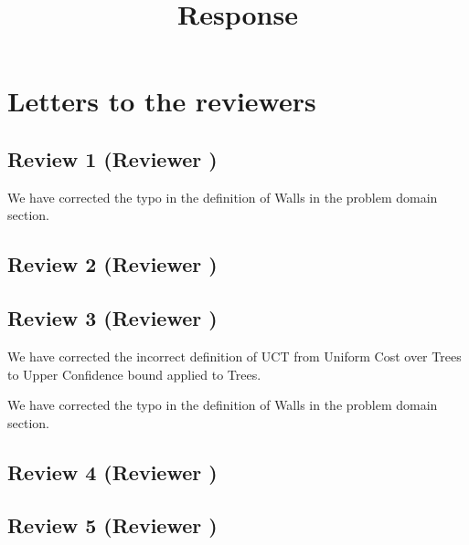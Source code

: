 \documentclass{article}
\title{Response}
\begin{document}
\maketitle
\section{Letters to the reviewers}
\subsection{Review 1 (Reviewer )}
We have corrected the typo in the definition of Walls in the problem domain section.
\subsection{Review 2 (Reviewer )}
\subsection{Review 3 (Reviewer )}
We have corrected the incorrect definition of UCT from Uniform Cost over Trees to Upper Confidence bound applied to Trees.

We have corrected the typo in the definition of Walls in the problem domain section.
\subsection{Review 4 (Reviewer )}
\subsection{Review 5 (Reviewer )}
\end{document}
